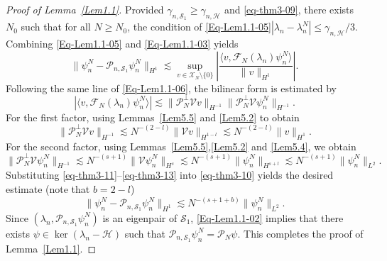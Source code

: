 \documentclass[10pt,a4paper]{amsart}
\begin{document}
\begin{proof}[Proof of Lemma~\ref{Lem1.1}]
Provided $\gamma_{n,\mathcal{S}_1}\geq \gamma_{n,\mathcal{H}}$ and \eqref{eq-thm3-09}, there exists $N_0$ such that for all $N\geq N_0$, the condition of \eqref{Eq-Lem1.1-05}$|\lambda_n - \lambda_n^N| \leq \gamma_{n,\mathcal{H}}/3$. Combining \eqref{Eq-Lem1.1-05} and \eqref{Eq-Lem1.1-03} yields
\begin{equation}\label{eq-thm3-10}
\|\psi_n^N - \mathcal{P}_{n,\mathcal{S}_1}\psi_n^N\|_{H^1}
\lesssim 
\sup_{v\in \mathscr{X}_N\setminus\{0\}}
\left|
\frac{\langle v,\mathcal{F}_N(\lambda_n)\psi_n^N\rangle}{\|v\|_{H^1}}
\right|.
\end{equation}
Following the same line of \eqref{Eq-Lem1.1-06}, the bilinear form is estimated by
\begin{equation}\label{eq-thm3-11}
\left|\langle v,\mathcal{F}_N(\lambda_n)\psi_n^N\rangle\right|
\lesssim \|\mathcal{P}_N^\perp \mathcal{V}v\|_{H^{-1}}
\|\mathcal{P}_N^\perp \mathcal{V}\psi_n^N\|_{H^{-1}}.
\end{equation}
For the first factor, using Lemmas~\ref{Lem5.5} and \ref{Lem5.2} to obtain
\begin{equation}\label{eq-thm3-12}
\|\mathcal{P}_N^\perp \mathcal{V}v\|_{H^{-1}}
\lesssim 
N^{-(2-l)} \|\mathcal{V}v\|_{H^{1-l}}
\lesssim 
N^{-(2-l)} \|v\|_{H^1}.
\end{equation}
For the second factor, using Lemmas~\ref{Lem5.5},\ref{Lem5.2} and \ref{Lem5.4}, we obtain
\begin{equation}\label{eq-thm3-13}
\|\mathcal{P}_N^\perp \mathcal{V}\psi_n^N\|_{H^{-1}}
\lesssim 
N^{-(s+1)} \|\mathcal{V}\psi_n^N\|_{H^s}
\lesssim 
N^{-(s+1)} \|\psi_n^N\|_{H^{s+l}}
\lesssim 
N^{-(s+1)} \|\psi_n^N\|_{L^2}.
\end{equation}
Substituting \eqref{eq-thm3-11}--\eqref{eq-thm3-13} into \eqref{eq-thm3-10} yields the desired estimate (note that $b=2-l$)
\[
\|\psi_n^N - \mathcal{P}_{n,\mathcal{S}_1}\psi_n^N\|_{H^1}
\lesssim 
N^{-(s+1+b)} \|\psi_n^N\|_{L^2}.
\]
Since $(\lambda_n,\mathcal P_{n,\mathcal{S}_1} \psi_n^N)$ is an eigenpair of $\mathcal{S}_1$, \eqref{Eq-Lem1.1-02} implies that there exists $\psi \in \operatorname{ker}(\lambda_n-\mathcal{H})$ such that $\mathcal P_{n,\mathcal{S}_1 } \psi_n^N =\mathcal{P}_N \psi$. This completes the proof of Lemma~\ref{Lem1.1}.
\end{proof}
\end{document}
